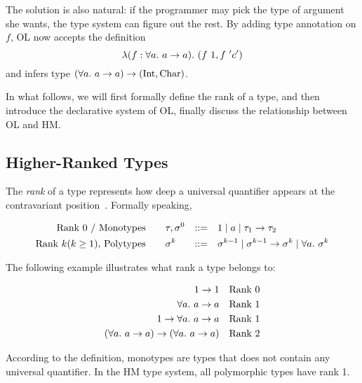 The solution is also natural: if the programmer may pick the type of argument she wants,
the type system can figure out the rest. By adding type annotation on $f$,
OL now accepts the definition
$$\lam[(f:\all a \to a)] (f~1, f~'c')$$
and infers type $(\all a \to a) \to (\text{Int}, \text{Char})$.

In what follows, we will first formally define the rank of a type,
and then introduce the declarative system of OL,
finally discuss the relationship between OL and HM.

\subsection{Higher-Ranked Types}

The \emph{rank} of a type represents how deep a universal quantifier
appears at the contravariant position~\citep{rank1992kfoury}. Formally speaking,

\begin{gather*}
    \begin{aligned}
        \text{Rank 0 / Monotypes}\qquad& \tau, \sigma^0 &::=&\quad 1 \mid a \mid \tau_1\to \tau_2\\
        \text{Rank $k (k \ge 1)$, Polytypes}\qquad& \sigma^k &::=&\quad
            \sigma^{k-1} \mid \sigma^{k-1} \to \sigma^k \mid \all \sigma^k\\
    \end{aligned}
\end{gather*}

The following example illustrates what rank a type belongs to:

\begin{gather*}
    \begin{aligned}
        1 \to 1 && \text{Rank 0}\\
        \all a \to a && \text{Rank 1}\\
        1 \to \all a \to a && \text{Rank 1}\\
        (\all a \to a) \to (\all a \to a) && \text{Rank 2}\\
    \end{aligned}
\end{gather*}

According to the definition, monotypes are types that does not contain any universal quantifier.
In the HM type system, all polymorphic types have rank 1.


